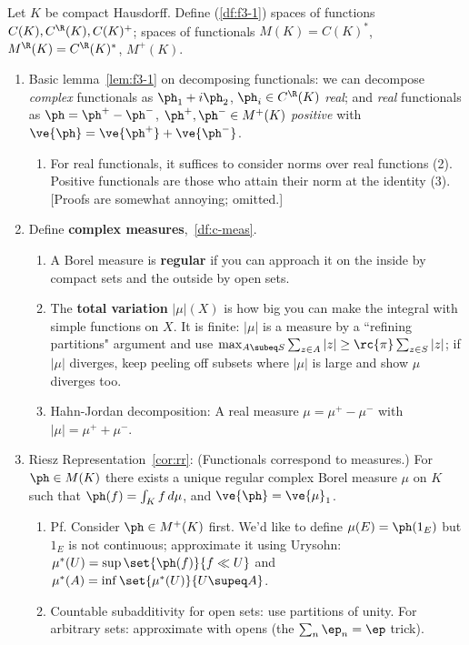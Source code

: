 Let $K$ be compact Hausdorff. 
Define (\ref{df:f3-1}) spaces of functions $C(K), C^{\R}(K), C(K)^+$; spaces of functionals $M(K)=C(K)^*$, $M^{\R}(K)=C^{\R}(K)^*$, $M^+(K)$.
\begin{enumerate}
\item Basic lemma~\ref{lem:f3-1} on decomposing functionals: we can decompose {\it complex} functionals as $\ph_1+i\ph_2$, $\ph_i\in C^{\R}(K)$ {\it real}; and {\it real} functionals as $\ph=\ph^+-\ph^-$, $\ph^+,\ph^-\in M^+(K)$ {\it positive} with $\ve{\ph}=\ve{\ph^+}+\ve{\ph^-}$.
\begin{enumerate}
\item
For real functionals, it suffices to consider norms over real functions (2). Positive functionals are those who attain their norm at the identity (3). [Proofs are somewhat annoying; omitted.]
\end{enumerate}
\item Define \textbf{complex measures},~\ref{df:c-meas}.
\begin{enumerate}
\item
A Borel measure is \textbf{regular} if you can approach it on the inside by compact sets and the outside by open sets.
\item
The \textbf{total variation} $|\mu|(X)$ is how big you can make the integral with simple functions on $X$. It is finite: $|\mu|$ is a measure by a ``refining partitions" argument and use $\max_{A\subeq S} \sum_{z\in A}|z|\ge \rc{\pi}\sum_{z\in S}|z|$; if $|\mu|$ diverges, keep peeling off subsets where $|\mu|$ is large and show $\mu$ diverges too.
\item
Hahn-Jordan decomposition: A real measure $\mu=\mu^+-\mu^-$ with $|\mu|=\mu^++\mu^-$.
\end{enumerate}
\item Riesz Representation~\ref{cor:rr}: (Functionals correspond to measures.) For $\ph\in M(K)$ there exists a unique regular complex Borel measure $\mu$ on $K$ such that $\ph(f)=\int_K f\,d\mu$, and $\ve{\ph}=\ve{\mu}_1$.
\begin{enumerate}
\item
Pf. Consider $\ph\in M^+(K)$ first. We'd like to define $\mu(E)=\ph(1_E)$ but $1_E$ is not continuous; approximate it using Urysohn: $\mu^*(U)=\sup\set{\ph(f)}{f\ll U}$ and $\mu^*(A)=\inf \set{\mu^*(U)}{U\supeq A}$.
\item
Countable subadditivity for open sets: use partitions of unity. For arbitrary sets: approximate with opens (the $\sum_n \ep_n=\ep$ trick).

\end{enumerate}
\end{enumerate}
